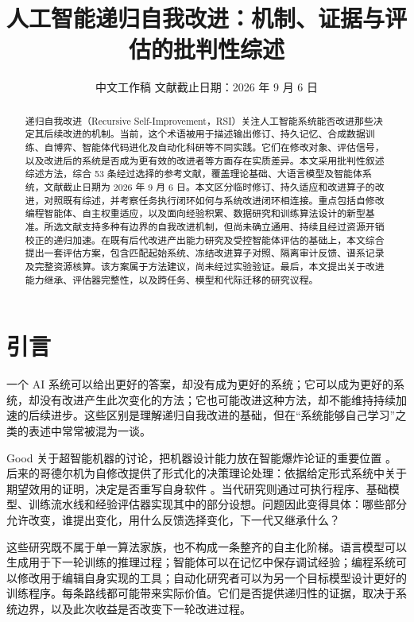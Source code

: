 \documentclass[11pt,,]{article}
\title{人工智能递归自我改进：机制、证据与评估的批判性综述}
\date{中文工作稿 \textbar{} 文献截止日期：2026 年 9 月 6 日}
\begin{document}
\maketitle
\begin{abstract}
递归自我改进（Recursive
Self-Improvement，RSI）关注人工智能系统能否改进那些决定其后续改进的机制。当前，这个术语被用于描述输出修订、持久记忆、合成数据训练、自博弈、智能体代码进化及自动化科研等不同实践。它们在修改对象、评估信号，以及改进后的系统是否成为更有效的改进者等方面存在实质差异。本文采用批判性叙述综述方法，综合
53
条经过选择的参考文献，覆盖理论基础、大语言模型及智能体系统，文献截止日期为
2026 年 9 月 6
日。本文区分临时修订、持久适应和改进算子的改进，对照既有综述，并考察任务执行闭环如何与系统改进闭环相连接。重点包括自修改编程智能体、自主权重适应，以及面向经验积累、数据研究和训练算法设计的新型基准。所选文献支持多种有边界的自我改进机制，但尚未确立通用、持续且经过资源开销校正的递归加速。在既有后代改进产出能力研究及受控智能体评估的基础上，本文综合提出一套评估方案，包含匹配起始系统、冻结改进算子对照、隔离审计反馈、谱系记录及完整资源核算。该方案属于方法建议，尚未经过实验验证。最后，本文提出关于改进能力继承、评估器完整性，以及跨任务、模型和代际迁移的研究议程。
\end{abstract}

\hypertarget{ux5f15ux8a00}{%
\section{引言}\label{ux5f15ux8a00}}

一个 AI
系统可以给出更好的答案，却没有成为更好的系统；它可以成为更好的系统，却没有改进产生此次变化的方法；它也可能改进这种方法，却不能维持持续加速的后续进步。这些区别是理解递归自我改进的基础，但在``系统能够自己学习''之类的表述中常常被混为一谈。

Good 关于超智能机器的讨论，把机器设计能力放在智能爆炸论证的重要位置
\citep{good1965}。后来的哥德尔机为自修改提供了形式化的决策理论处理：依据给定形式系统中关于期望效用的证明，决定是否重写自身软件
\citep{goedel2003}。当代研究则通过可执行程序、基础模型、训练流水线和经验评估器实现其中的部分设想。问题因此变得具体：哪些部分允许改变，谁提出变化，用什么反馈选择变化，下一代又继承什么？

这些研究既不属于单一算法家族，也不构成一条整齐的自主化阶梯。语言模型可以生成用于下一轮训练的推理过程；智能体可以在记忆中保存调试经验；编程系统可以修改用于编辑自身实现的工具；自动化研究者可以为另一个目标模型设计更好的训练程序。每条路线都可能带来实际价值。它们是否提供递归性的证据，取决于系统边界，以及此次收益是否改变下一轮改进过程。
\end{document}
